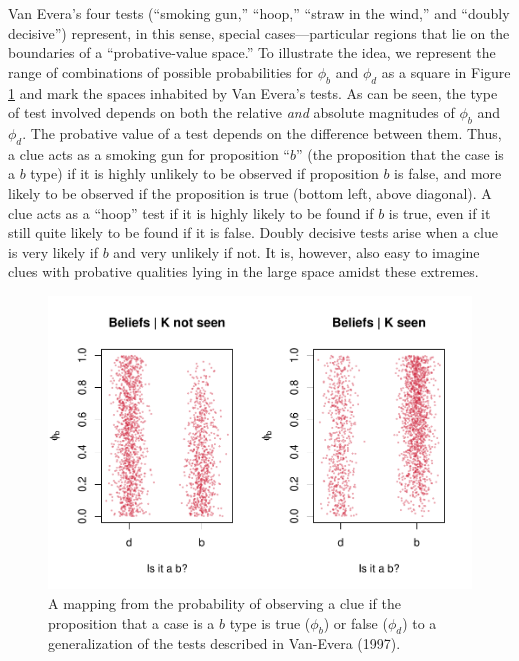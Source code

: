 \documentclass[12pt,]{book}
\begin{document}
Van Evera's four tests (``smoking gun,'' ``hoop,'' ``straw in the wind,'' and ``doubly decisive'') represent, in this sense, special cases---particular regions that lie on the boundaries of a ``probative-value space.'' To illustrate the idea, we represent the range of combinations of possible probabilities for \(\phi_b\) and \(\phi_d\) as a square in Figure \ref{CluesInferences1} and mark the spaces inhabited by Van Evera's tests. As can be seen, the type of test involved depends on both the relative \emph{and} absolute magnitudes of \(\phi_b\) and \(\phi_d\). The probative value of a test depends on the difference between them. Thus, a clue acts as a smoking gun for proposition ``\(b\)'' (the proposition that the case is a \(b\) type) if it is highly unlikely to be observed if proposition \(b\) is false, and more likely to be observed if the proposition is true (bottom left, above diagonal). A clue acts as a ``hoop'' test if it is highly likely to be found if \(b\) is true, even if it still quite likely to be found if it is false. Doubly decisive tests arise when a clue is very likely if \(b\) and very unlikely if not. It is, however, also easy to imagine clues with probative qualities lying in the large space amidst these extremes.

\begin{figure}
\centering
\includegraphics{ii_files/figure-latex/unnamed-chunk-20-1.pdf}
\caption{\label{fig:unnamed-chunk-20}\label{CluesInferences1} A mapping from the probability of observing a clue if the proposition that a case is a \(b\) type is true (\(\phi_b\)) or false (\(\phi_d\)) to a generalization of the tests described in Van-Evera (1997).}
\end{figure}
\end{document}
